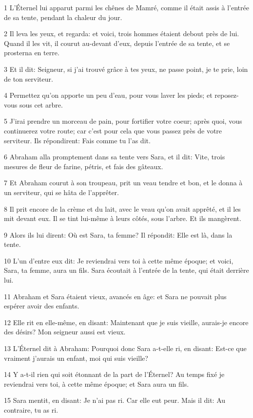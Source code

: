 \par 1 L'Éternel lui apparut parmi les chênes de Mamré, comme il était assis à l'entrée de sa tente, pendant la chaleur du jour.
\par 2 Il leva les yeux, et regarda: et voici, trois hommes étaient debout près de lui. Quand il les vit, il courut au-devant d'eux, depuis l'entrée de sa tente, et se prosterna en terre.
\par 3 Et il dit: Seigneur, si j'ai trouvé grâce à tes yeux, ne passe point, je te prie, loin de ton serviteur.
\par 4 Permettez qu'on apporte un peu d'eau, pour vous laver les pieds; et reposez-vous sous cet arbre.
\par 5 J'irai prendre un morceau de pain, pour fortifier votre coeur; après quoi, vous continuerez votre route; car c'est pour cela que vous passez près de votre serviteur. Ils répondirent: Fais comme tu l'as dit.
\par 6 Abraham alla promptement dans sa tente vers Sara, et il dit: Vite, trois mesures de fleur de farine, pétris, et fais des gâteaux.
\par 7 Et Abraham courut à son troupeau, prit un veau tendre et bon, et le donna à un serviteur, qui se hâta de l'apprêter.
\par 8 Il prit encore de la crème et du lait, avec le veau qu'on avait apprêté, et il les mit devant eux. Il se tint lui-même à leurs côtés, sous l'arbre. Et ils mangèrent.
\par 9 Alors ils lui dirent: Où est Sara, ta femme? Il répondit: Elle est là, dans la tente.
\par 10 L'un d'entre eux dit: Je reviendrai vers toi à cette même époque; et voici, Sara, ta femme, aura un fils. Sara écoutait à l'entrée de la tente, qui était derrière lui.
\par 11 Abraham et Sara étaient vieux, avancés en âge: et Sara ne pouvait plus espérer avoir des enfants.
\par 12 Elle rit en elle-même, en disant: Maintenant que je suis vieille, aurais-je encore des désirs? Mon seigneur aussi est vieux.
\par 13 L'Éternel dit à Abraham: Pourquoi donc Sara a-t-elle ri, en disant: Est-ce que vraiment j'aurais un enfant, moi qui suis vieille?
\par 14 Y a-t-il rien qui soit étonnant de la part de l'Éternel? Au temps fixé je reviendrai vers toi, à cette même époque; et Sara aura un fils.
\par 15 Sara mentit, en disant: Je n'ai pas ri. Car elle eut peur. Mais il dit: Au contraire, tu as ri.
